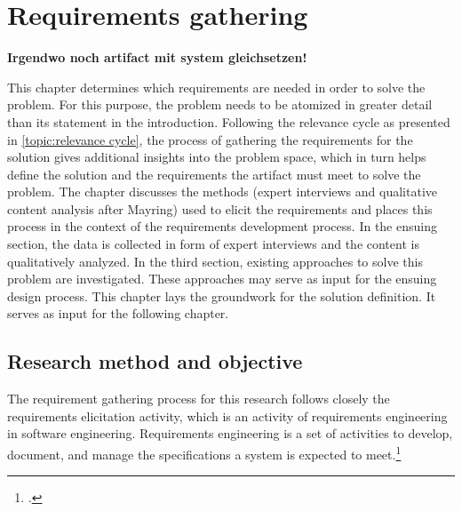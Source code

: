 \chapter{Requirements gathering} \label{chap:ReqEng}
\textbf{Irgendwo noch artifact mit system gleichsetzen!}

This chapter determines which requirements are needed in order to solve the problem. For this purpose, the problem needs to be atomized in greater detail than its statement in the introduction. Following the relevance cycle as presented in \ref{topic:relevance cycle}, the process of gathering the requirements for the solution gives additional insights into the problem space, which in turn helps define the solution and the requirements the artifact must meet to solve the problem. The chapter discusses the methods (expert interviews and qualitative content analysis after Mayring) used to elicit the requirements and places this process in the context of the requirements development process. In the ensuing section, the data is collected in form of expert interviews and the content is qualitatively analyzed. In the third section, existing approaches to solve this problem are investigated. These approaches may serve as input for the ensuing design process. This chapter lays the groundwork for the solution definition. It serves as input for the following chapter. 

\section{Research method and objective}
The requirement gathering process for this research follows closely the requirements elicitation activity, which is an activity of requirements engineering in software engineering. Requirements engineering is a set of activities to develop, document, and manage the specifications a system is expected to meet.\footcites[Cf.][p.16]{SommervilleIntegratedrequirementsengineering2005}[cf.][p.38]{PatakiSystemRequirementsAnalysis2003}


